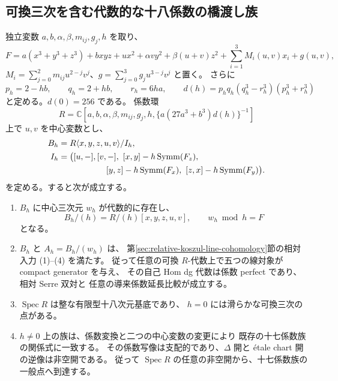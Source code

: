 \subsection{可換三次を含む代数的な十八係数の橋渡し族}
\label{subsec:kuznetsov-algebraic-bridge}

\begin{proposition}[完備化を使わない相対量子化族]
\label{prop:kuznetsov-algebraic-bridge}
独立変数 $a,b,\alpha,\beta,m_{ij},g_j,h$ を取り、
\[
 F=a(x^3+y^3+z^3)+bxyz+ux^2+\alpha vy^2+\beta(u+v)z^2
       +\sum_{i=1}^3M_i(u,v)x_i+g(u,v),
\]
$M_i=\sum_{j=0}^2m_{ij}u^{2-j}v^j$、$g=\sum_{j=0}^3g_ju^{3-j}v^j$ と置く。
さらに
\[
 p_h=2-hb,\qquad q_h=2+hb,\qquad r_h=6ha,
 \qquad d(h)=p_hq_h(q_h^3-r_h^3)(p_h^3+r_h^3)
\]
と定める。$d(0)=256$ である。
係数環
\[
 R=\mathbb C[a,b,\alpha,\beta,m_{ij},g_j,h,
                 \{a(27a^3+b^3)d(h)\}^{-1}]
\]
上で $u,v$ を中心変数とし、
\[
 \begin{aligned}
 B_h&=R\langle x,y,z,u,v\rangle/I_h,\\
 I_h&=\bigl([u,-],[v,-],\ [x,y]-h\operatorname{Symm}(F_z),\\
 &\hspace{20mm}[y,z]-h\operatorname{Symm}(F_x),\ [z,x]-h\operatorname{Symm}(F_y)\bigr).
 \end{aligned}
\]
を定める。すると次が成立する。
\begin{enumerate}
\item $B_h$ に中心三次元 $w_h$ が代数的に存在し、
\[
 B_h/(h)=R/(h)[x,y,z,u,v],\qquad w_h\bmod h=F
\]
となる。
\item $B_h$ と $A_h=B_h/(w_h)$ は、
第\ref{sec:relative-koszul-line-cohomology}節の相対入力 (1)--(4) を満たす。
従って任意の可換 $R$-代数上で五つの線対象が compact generator を与え、
その自己 Hom dg 代数は係数 perfect であり、相対 Serre 双対と
任意の導来係数延長比較が成立する。
\item $\operatorname{Spec}R$ は整な有限型十八次元基底であり、
$h=0$ には滑らかな可換三次の点がある。
\item $h\ne0$ 上の族は、係数変換と二つの中心変数の変更により
既存の十七係数族の関係式に一致する。
その係数写像は支配的であり、$\Delta$ 開と étale chart 開の逆像は非空開である。
従って $\operatorname{Spec}R$ の任意の非空開から、十七係数族の一般点へ到達する。
\end{enumerate}
\end{proposition}

